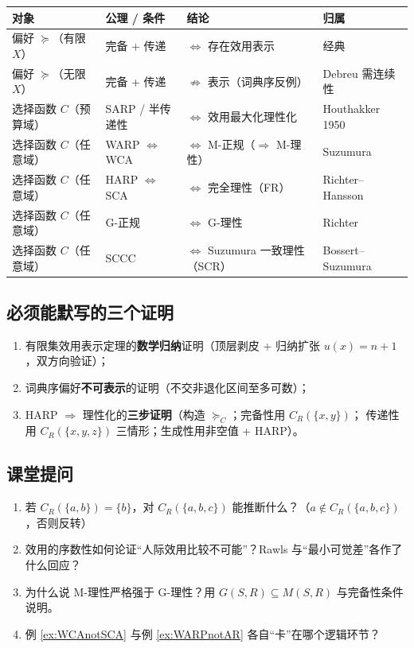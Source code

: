 \begin{center}
\small
\begin{tabular}{llll}
\toprule
\textbf{对象} & \textbf{公理 / 条件} & \textbf{结论} & \textbf{归属} \\
\midrule
偏好 $\succeq$（有限 $X$） & 完备 + 传递 & $\iff$ 存在效用表示 & 经典 \\
偏好 $\succeq$（无限 $X$） & 完备 + 传递 & $\not\Rightarrow$ 表示（词典序反例） & Debreu 需连续性 \\
选择函数 $C$（预算域） & SARP / 半传递性 & $\iff$ 效用最大化理性化 & Houthakker 1950 \\
选择函数 $C$（任意域） & WARP $\iff$ WCA & $\iff$ M-正规（$\Rightarrow$ M-理性） & Suzumura \\
选择函数 $C$（任意域） & HARP $\iff$ SCA & $\iff$ 完全理性（FR） & Richter--Hansson \\
选择函数 $C$（任意域） & G-正规 & $\iff$ G-理性 & Richter \\
选择函数 $C$（任意域） & SCCC & $\iff$ Suzumura 一致理性（SCR） & Bossert--Suzumura \\
\bottomrule
\end{tabular}
\end{center}

\subsection{必须能默写的三个证明}
\begin{enumerate}
  \item 有限集效用表示定理的\textbf{数学归纳}证明（顶层剥皮 + 归纳扩张 $u(x)=n+1$，双方向验证）；
  \item 词典序偏好\textbf{不可表示}的证明（不交非退化区间至多可数）；
  \item HARP $\Rightarrow$ 理性化的\textbf{三步证明}（构造 $\succeq_C$；完备性用 $C_R(\{x,y\})$；
  传递性用 $C_R(\{x,y,z\})$ 三情形；生成性用非空值 + HARP）。
\end{enumerate}

\subsection{课堂提问}
\begin{enumerate}
  \item 若 $C_R(\{a,b\})=\{b\}$，对 $C_R(\{a,b,c\})$ 能推断什么？（$a\notin C_R(\{a,b,c\})$，否则反转）
  \item 效用的序数性如何论证“人际效用比较不可能”？Rawls 与“最小可觉差”各作了什么回应？
  \item 为什么说 M-理性严格强于 G-理性？用 $G(S,R)\subseteq M(S,R)$ 与完备性条件说明。
  \item 例 \ref{ex:WCAnotSCA} 与例 \ref{ex:WARPnotAR} 各自“卡”在哪个逻辑环节？
\end{enumerate}


